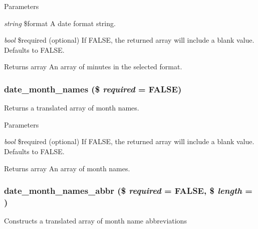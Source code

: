 \begin{DoxyParams}{Parameters}
\item[{\em string}]\$format A date format string. \item[{\em bool}]\$required (optional) If FALSE, the returned array will include a blank value. Defaults to FALSE.\end{DoxyParams}
\begin{DoxyReturn}{Returns}
array An array of minutes in the selected format. 
\end{DoxyReturn}
\hypertarget{date__api_8module_a4ab8ec4182c77747101651e9ce87a8ea}{
\subsubsection[{date\_\-month\_\-names}]{\setlength{\rightskip}{0pt plus 5cm}date\_\-month\_\-names (\$ {\em required} = {\ttfamily FALSE})}}
\label{date__api_8module_a4ab8ec4182c77747101651e9ce87a8ea}
Returns a translated array of month names.


\begin{DoxyParams}{Parameters}
\item[{\em bool}]\$required (optional) If FALSE, the returned array will include a blank value. Defaults to FALSE.\end{DoxyParams}
\begin{DoxyReturn}{Returns}
array An array of month names. 
\end{DoxyReturn}
\hypertarget{date__api_8module_af6f2f2a2ec22415e16998419b0cca858}{
\subsubsection[{date\_\-month\_\-names\_\-abbr}]{\setlength{\rightskip}{0pt plus 5cm}date\_\-month\_\-names\_\-abbr (\$ {\em required} = {\ttfamily FALSE}, \/  \$ {\em length} = {})}}
\label{date__api_8module_af6f2f2a2ec22415e16998419b0cca858}
Constructs a translated array of month name abbreviations


